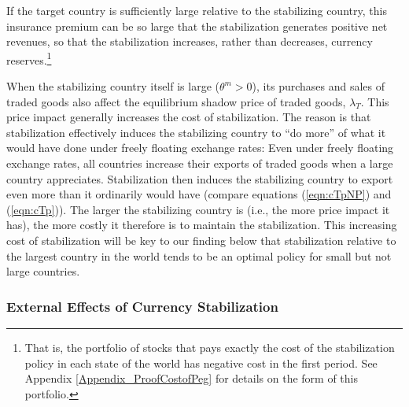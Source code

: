\documentclass[12pt,letter]{article}
\theoremstyle{break} \theorembodyfont{\normalfont\itshape}
\theoremstyle{break}
\theoremstyle{break} \theorembodyfont{\normalfont\itshape}
\theoremstyle{break} \theorembodyfont{\normalfont\itshape}
\begin{document}
If the target country is sufficiently large relative to the
stabilizing country, this insurance premium can be so large that the
stabilization generates positive net revenues, so that the
stabilization increases, rather than decreases, currency
reserves.\footnote{That is, the portfolio of stocks that pays exactly
  the cost of the stabilization policy in each state of the world has
  negative cost in the first period. See Appendix
  \ref{Appendix_ProofCostofPeg} for details on the form of this
  portfolio.}

When the stabilizing country itself is large (\(\theta^m>0\)), its
purchases and sales of traded goods also affect the equilibrium shadow
price of traded goods, \(\lambda_{T}\). This price impact generally
increases the cost of stabilization. The reason is that stabilization
effectively induces the stabilizing country to ``do more'' of what it
would have done under freely floating exchange rates: Even under
freely floating exchange rates, all countries increase their exports
of traded goods when a large country appreciates. Stabilization then
induces the stabilizing country to export even more than it ordinarily
would have (compare equations (\ref{eqn:cTpNP}) and (\ref{eqn:cTp})).
The larger the stabilizing country is (i.e., the more price impact it
has), the more costly it therefore is to maintain the stabilization.
This increasing cost of stabilization will be key to our finding below
that stabilization relative to the largest country in the world tends
to be an optimal policy for small but not large countries.



\subsubsection{External Effects of Currency Stabilization}
\end{document}
